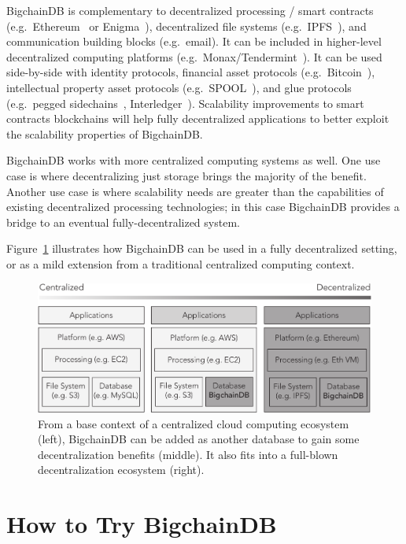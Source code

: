 \documentclass[a4paper]{article}
\begin{document}
BigchainDB is complementary to decentralized processing / smart contracts (e.g.~Ethereum~\cite{ethereum,buterin-ethereum} or Enigma~\cite{enigma,zyskind2015enigma}), decentralized file systems (e.g.~IPFS~\cite{ipfs}), and communication building blocks (e.g.~email).
It can be included in higher-level decentralized computing platforms (e.g.~Monax/Tendermint~\cite{monax,tendermint}).
It can be used side-by-side with identity protocols, financial asset protocols (e.g.~Bitcoin~\cite{nakamoto2009bitcoin}), intellectual property asset protocols (e.g.~SPOOL~\cite{dejonghe_spool}), and glue protocols (e.g.~pegged sidechains~\cite{back2010sidechains}, Interledger~\cite{thomas2015interledger}).
Scalability improvements to smart contracts blockchains will help fully decentralized applications to better exploit the scalability properties of BigchainDB.

BigchainDB works with more centralized computing systems as well.
One use case is where decentralizing just storage brings the majority of the benefit.
Another use case is where scalability needs are greater than the capabilities of existing decentralized processing technologies; in this case BigchainDB provides a bridge to an eventual fully-decentralized system.

Figure~\ref{fig:bigchain_ecosystem} illustrates how BigchainDB can be used in a fully decentralized setting, or as a mild extension from a traditional centralized computing context.


\begin{figure}[!ht]
  \centering
  \includegraphics[width=\textwidth]{figure_1.pdf}
  \caption{From a base context of a centralized cloud computing ecosystem (left), BigchainDB can be added as another database to gain some decentralization benefits (middle).
  It also fits into a full-blown decentralization ecosystem (right).}
  \label{fig:bigchain_ecosystem}
\end{figure}


\section{How to Try BigchainDB}
\end{document}
